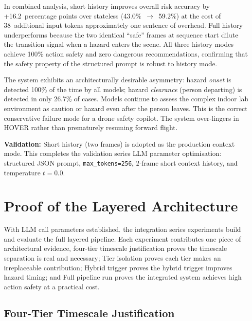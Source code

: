 In combined analysis, short history improves overall risk accuracy by +16.2~percentage points over stateless (43.0\%~$\to$~59.2\%) at the cost of 38~additional input tokens approximately one sentence of overhead. 
Full history underperforms because the two identical ``safe'' frames at sequence start dilute the transition signal when
a hazard enters the scene. 
All three history modes achieve 100\% action safety
and zero dangerous recommendations, confirming that the safety property of the structured prompt is robust to history mode.

The system exhibits an architecturally desirable asymmetry: hazard \emph{onset} is detected 100\% of the time by all models; hazard \emph{clearance} (person departing) is detected in only 26.7\% of cases. 
Models continue to assess the complex indoor lab environment as caution or hazard even after the person leaves.
This is the correct conservative failure mode for a drone safety copilot.
The system over-lingers in HOVER rather than prematurely resuming forward flight.

\textbf{Validation:} Short history (two frames) is adopted as the production context mode.
This completes the validation series LLM parameter optimisation: structured JSON prompt, \texttt{max\_tokens=256}, 2-frame short context history, and temperature $t=0.0$.

\section{Proof of the Layered Architecture}
\label{sec:ch2_gseries}

With LLM call parameters established, the integration series experiments build and evaluate the full layered pipeline. 
Each experiment contributes one piece of architectural evidence, four-tier timescale justification proves the timescale separation is real and necessary; Tier isolation proves each tier makes an irreplaceable contribution; Hybrid trigger proves
the hybrid trigger improves hazard timing; and Full pipeline run proves the integrated system achieves high action safety at a practical cost.

\subsection{Four-Tier Timescale Justification}
\label{sec:ch2_g4}

